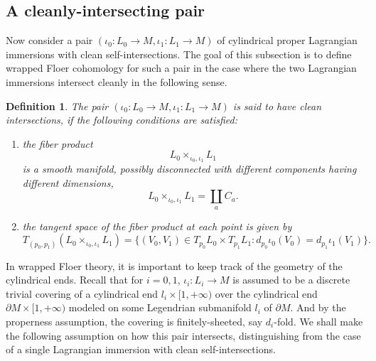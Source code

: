 \documentclass{amsart}
\newtheorem{definition}[theorem]{Definition}
\numberwithin{equation}{section}
\numberwithin{figure}{section}
\begin{document}
\subsection{A cleanly-intersecting pair}\label{section: wrapped Floer cochain space for a pair with clean intersections}
	Now consider a pair $(\iota_{0}: L_{0} \to M, \iota_{1}: L_{1} \to M)$ of cylindrical proper Lagrangian immersions with clean self-intersections. The goal of this subsection is to define wrapped Floer cohomology for such a pair in the case where the two Lagrangian immersions intersect cleanly in the following sense. \par

\begin{definition}
	The pair $(\iota_{0}: L_{0} \to M, \iota_{1}: L_{1} \to M)$ is said to have clean intersections, if the following conditions are satisfied:
\begin{enumerate}[label=(\roman*)]

\item the fiber product
\begin{equation*}
L_{0} \times_{\iota_{0}, \iota_{1}} L_{1}
\end{equation*}
is a smooth manifold, possibly disconnected with different components having different dimensions,
\begin{equation}
L_{0} \times_{\iota_{0}, \iota_{1}} L_{1} = \coprod_{a} C_{a}.
\end{equation}

\item the tangent space of the fiber product at each point is given by
\begin{equation}
T_{(p_{0}, p_{1})}(L_{0} \times_{\iota_{0}, \iota_{1}} L_{1}) = \{(V_{0}, V_{1}) \in T_{p_{0}}L_{0} \times T_{p_{1}}L_{1}: d_{p_{0}}\iota_{0}(V_{0}) = d_{p_{1}}\iota_{1}(V_{1})\}.
\end{equation}

\end{enumerate}
\end{definition}

	In wrapped Floer theory, it is important to keep track of the geometry of the cylindrical ends. Recall that for $i = 0, 1$, $\iota_{i}: L_{i} \to M$ is assumed to be a discrete trivial covering of a cylindrical end $l_{i} \times [1, +\infty)$ over the cylindrical end $\partial M \times [1, +\infty)$ modeled on some Legendrian submanifold $l_{i}$ of $\partial M$. And by the properness assumption, the covering is finitely-sheeted, say $d_{i}$-fold. We shall make the following assumption on how this pair intersects, distinguishing from the case of a single Lagrangian immersion with clean self-intersections. \par
\end{document}
